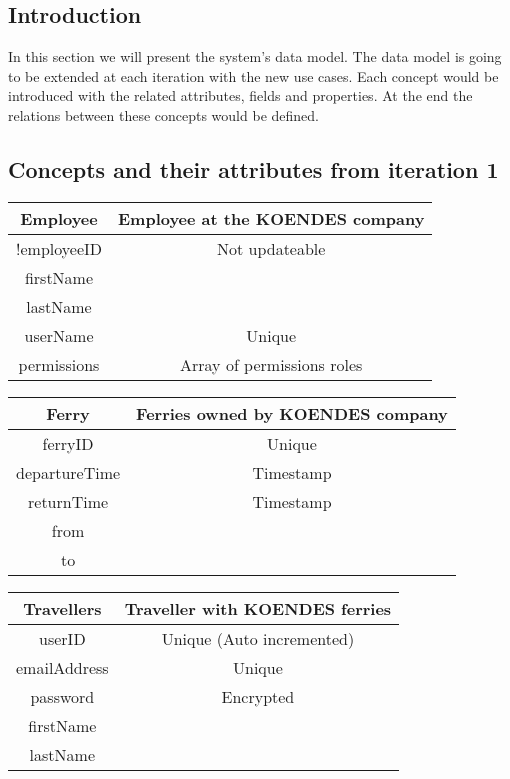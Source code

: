 
\subsection{Introduction}
In this section we will present the system's data model. The data model is going to be extended at each iteration with the new use cases. Each concept would be introduced with the related attributes, fields and properties. At the end the relations between these concepts would be defined.
\subsection{Concepts and their attributes from iteration 1}
\begin{table}[H]
\begin{tabular}{|c|c}
\cline{1-1}
Employee & Employee at the KOENDES company \\ \hline
!employeeID & Not updateable \\ firstName \\ lastName \\ userName & Unique \\ permissions & Array of permissions roles\\\hline
\end{tabular}
\end{table}

\begin{table}[H]
\begin{tabular}{|c|c}
\cline{1-1}
Ferry & Ferries owned by KOENDES company \\ \hline
ferryID & Unique \\ departureTime & Timestamp \\ returnTime & Timestamp \\ from \\ to \\\hline
\end{tabular}
\end{table}

\begin{table}[H]
\begin{tabular}{|c|c}
\cline{1-1}
Travellers & Traveller with KOENDES ferries \\ \hline
userID & Unique (Auto incremented) \\ emailAddress & Unique \\ password & Encrypted \\ firstName \\ lastName \\ \hline
\end{tabular}
\end{table}

